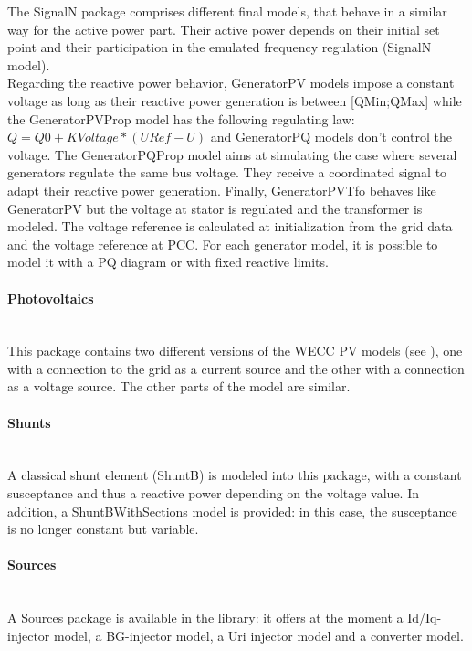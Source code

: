 \documentclass[a4paper, 12pt]{report}
\begin{document}
The SignalN package comprises different final models, that behave in a similar way for the active power part. Their active power depends on their initial set point and their participation in the emulated frequency regulation (SignalN model). \\
Regarding the reactive power behavior, GeneratorPV models impose a constant voltage as long as their reactive power generation is between [QMin;QMax] while the GeneratorPVProp model has the following regulating law: $Q = Q0 + KVoltage * (URef - U)$ and GeneratorPQ models don't control the voltage. The GeneratorPQProp model aims at simulating the case where several generators regulate the same bus voltage. They receive a coordinated signal to adapt their reactive power generation. Finally, GeneratorPVTfo behaves like GeneratorPV but the voltage at stator is regulated and the transformer is modeled. The voltage reference is calculated at initialization from the grid data and the voltage reference at PCC. For each generator model, it is possible to model it with a PQ diagram or with fixed reactive limits.

\paragraph{Photovoltaics}
~~\\

This package contains two different versions of the \ac{WECC} PV models (see \cite{WECC}), one with a connection to the grid as a current source and the other with a connection as a voltage source. The other parts of the model are similar.

\paragraph{Shunts}
~~\\

A classical shunt element (ShuntB) is modeled into this package, with a constant susceptance and thus a reactive power depending on the voltage value. In addition, a ShuntBWithSections model is provided: in this case, the susceptance is no longer constant but variable.

\paragraph{Sources}
~~\\

A Sources package is available in the library: it offers at the moment a Id/Iq-injector model, a BG-injector model, a Uri injector model and a converter model.
\end{document}
